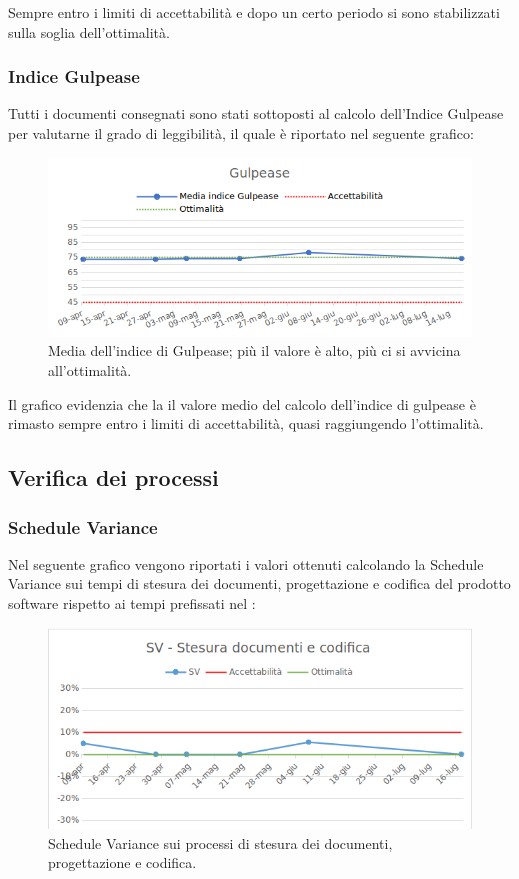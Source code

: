 Sempre entro i limiti di accettabilità e dopo un certo periodo si sono
 stabilizzati sulla soglia dell'ottimalità. 

\subsubsection{Indice Gulpease}

Tutti i documenti consegnati sono stati sottoposti al calcolo dell'Indice Gulpease per valutarne il grado di leggibilità, il quale è riportato nel seguente grafico:

\begin{figure}[h!]
	\centering
	\includegraphics[scale=0.75]{img/Grafici/Gulpease.png}
	\caption{Media dell'indice di Gulpease; più il valore è alto, più ci si avvicina all'ottimalità.}
	\label{fig:Gulpease}
\end{figure}

Il grafico evidenzia che la il valore medio del calcolo dell'indice di gulpease è rimasto sempre entro i limiti di accettabilità, quasi raggiungendo l'ottimalità.
\subsection{Verifica dei processi}
\subsubsection{Schedule Variance}
Nel seguente grafico vengono riportati i valori ottenuti calcolando la Schedule Variance sui tempi di stesura dei documenti, progettazione e codifica del prodotto software rispetto ai tempi prefissati nel \PdP{}:

\begin{figure}[h!]
	\centering
	\includegraphics[scale=0.75]{img/Grafici/SV.png}
	\caption{Schedule Variance sui processi di stesura dei documenti, progettazione e codifica.}
	\label{fig:SV-Documenti}
\end{figure}

